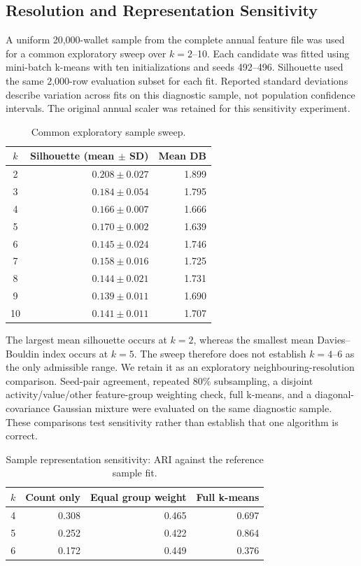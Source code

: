\subsection{Resolution and Representation Sensitivity}
A uniform 20,000-wallet sample from the complete annual feature file was used for a common exploratory sweep over $k=2$--10. Each candidate was fitted using mini-batch k-means with ten initializations and seeds 492--496. Silhouette used the same 2,000-row evaluation subset for each fit. Reported standard deviations describe variation across fits on this diagnostic sample, not population confidence intervals. The original annual scaler was retained for this sensitivity experiment.
\begin{table}[t]\centering\caption{Common exploratory sample sweep.}\label{tab:review_sweep}\small
\begin{tabular}{crr}\toprule $k$ & Silhouette (mean $\pm$ SD) & Mean DB \\\midrule
2 & $0.208 \pm 0.027$ & 1.899 \\
3 & $0.184 \pm 0.054$ & 1.795 \\
4 & $0.166 \pm 0.007$ & 1.666 \\
5 & $0.170 \pm 0.002$ & 1.639 \\
6 & $0.145 \pm 0.024$ & 1.746 \\
7 & $0.158 \pm 0.016$ & 1.725 \\
8 & $0.144 \pm 0.021$ & 1.731 \\
9 & $0.139 \pm 0.011$ & 1.690 \\
10 & $0.141 \pm 0.011$ & 1.707 \\
\bottomrule\end{tabular}\end{table}
The largest mean silhouette occurs at $k=2$, whereas the smallest mean Davies--Bouldin index occurs at $k=5$. The sweep therefore does not establish $k=4$--6 as the only admissible range. We retain it as an exploratory neighbouring-resolution comparison.
Seed-pair agreement, repeated 80\% subsampling, a disjoint activity/value/other feature-group weighting check, full k-means, and a diagonal-covariance Gaussian mixture were evaluated on the same diagnostic sample. These comparisons test sensitivity rather than establish that one algorithm is correct.
\begin{table}[t]\centering\caption{Sample representation sensitivity: ARI against the reference sample fit.}\small
\begin{tabular}{crrr}\toprule $k$ & Count only & Equal group weight & Full k-means \\\midrule
4 & 0.308 & 0.465 & 0.697 \\
5 & 0.252 & 0.422 & 0.864 \\
6 & 0.172 & 0.449 & 0.376 \\
\bottomrule\end{tabular}\end{table}
